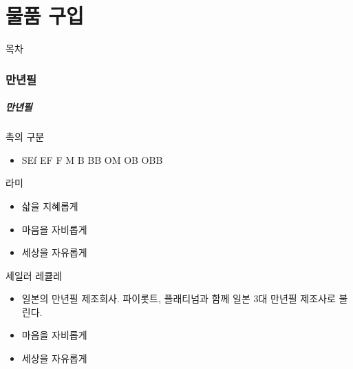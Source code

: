 \documentclass[aspectratio=1610,20pt,xcolor=pdftex,dvipsnames,table,handout]{beamer}
\begin{document}
		\begin{frame} [t,plain]
		\end{frame}						




		\part{물품 구입}
		\frame{\partpage}
		
\label{part5} 	%

		\begin{frame} [plain]{목차}
		\tableofcontents%
		\end{frame}

		\section{만년필}

		\begin{frame} [t,plain]
		\frametitle{만년필}

			\begin{block} {촉의 구분}
			\setlength{\leftmargini}{2em}			
			\begin{itemize}
				\item SEf EF F M B BB OM OB OBB
			\end{itemize}
			\end{block}						


			\begin{block} {라미}
			\setlength{\leftmargini}{2em}			
			\begin{itemize}
				\item 삷을 지혜롭게
				\item 마음을 자비롭게
				\item 세상을 자유롭게
			\end{itemize}
			\end{block}						

			\begin{block} {세일러 레큘레}
			\setlength{\leftmargini}{2em}			
			\begin{itemize}
				\item 일본의 만년필 제조회사. 파이롯트, 플래티넘과 함께 일본 3대 만년필 제조사로 불린다.
				\item 마음을 자비롭게
				\item 세상을 자유롭게
			\end{itemize}
			\end{block}						

		\end{frame}						
\end{document}
